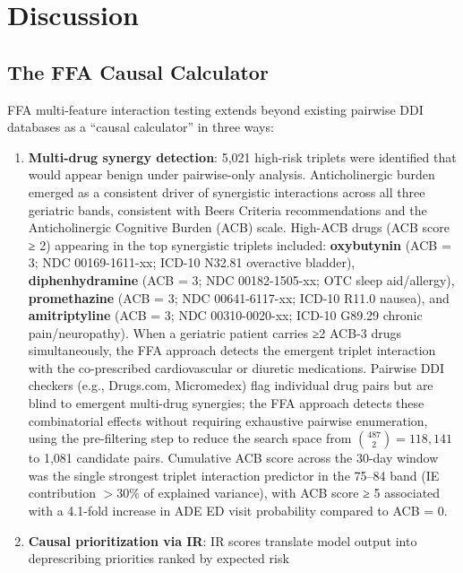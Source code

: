 \documentclass[
  12pt,
]{book}
\providecommand{\tightlist}{%
  \setlength{\itemsep}{0pt}\setlength{\parskip}{0pt}}
\begin{document}
\chapter{Discussion}\label{sec-discussion}

\section{The FFA Causal Calculator}\label{the-ffa-causal-calculator}

FFA multi-feature interaction testing extends beyond existing pairwise
DDI databases as a ``causal calculator'' in three ways:

\begin{enumerate}
\def\labelenumi{\arabic{enumi}.}
\tightlist
\item
  \textbf{Multi-drug synergy detection}: 5,021 high-risk triplets were
  identified that would appear benign under pairwise-only analysis.
  Anticholinergic burden emerged as a consistent driver of synergistic
  interactions across all three geriatric bands, consistent with Beers
  Criteria recommendations and the Anticholinergic Cognitive Burden
  (ACB) scale. High-ACB drugs (ACB score ≥ 2) appearing in the top
  synergistic triplets included: \textbf{oxybutynin} (ACB = 3; NDC
  00169-1611-xx; ICD-10 N32.81 overactive bladder),
  \textbf{diphenhydramine} (ACB = 3; NDC 00182-1505-xx; OTC sleep
  aid/allergy), \textbf{promethazine} (ACB = 3; NDC 00641-6117-xx;
  ICD-10 R11.0 nausea), and \textbf{amitriptyline} (ACB = 3; NDC
  00310-0020-xx; ICD-10 G89.29 chronic pain/neuropathy). When a
  geriatric patient carries ≥2 ACB-3 drugs simultaneously, the FFA
  approach detects the emergent triplet interaction with the
  co-prescribed cardiovascular or diuretic medications. Pairwise DDI
  checkers (e.g., Drugs.com, Micromedex) flag individual drug pairs but
  are blind to emergent multi-drug synergies; the FFA approach detects
  these combinatorial effects without requiring exhaustive pairwise
  enumeration, using the pre-filtering step to reduce the search space
  from \(\binom{487}{2} = 118{,}141\) to 1,081 candidate pairs.
  Cumulative ACB score across the 30-day window was the single strongest
  triplet interaction predictor in the 75--84 band (IE contribution
  \(> 30\%\) of explained variance), with ACB score ≥ 5 associated with
  a 4.1-fold increase in ADE ED visit probability compared to ACB = 0.
\item
  \textbf{Causal prioritization via IR}: IR scores translate model
  output into deprescribing priorities ranked by expected risk

\end{enumerate}
\end{document}
